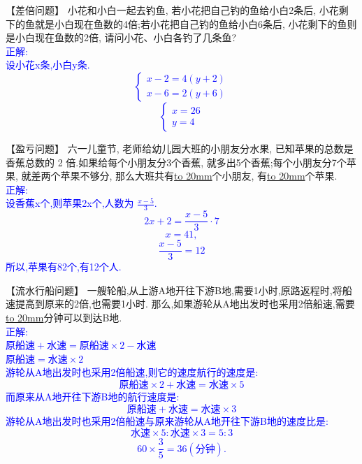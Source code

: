 \item {
    【差倍问题】
    小花和小白一起去钓鱼, 若小花把自己钓的鱼给小白2条后, 小花剩下的鱼就是小白现在鱼数的4倍;若小花把自己钓的鱼给小白6条后, 小花剩下的鱼则是小白现在鱼数的2倍, 请问小花、小白各钓了几条鱼?
    \ifshowSolution{}
        \fangsong{}\textcolor{blue}{
            \\正解:\\
            设小花x条,小白y条.\\
                \[\left\{\begin{array}{l}
                    x-2 = 4(y+2) \\
                    x-6 = 2(y+6)  
                \end{array}\right.\]
                \[\left\{\begin{array}{l}
                    x = 26 \\
                    y = 4 
                \end{array}\right.\]
        }
    \else
        \vspace{2cm}
    \fi
}

\item {
    【盈亏问题】
    六一儿童节, 老师给幼儿园大班的小朋友分水果, 已知苹果的总数是香蕉总数的 2 倍.如果给每个小朋友分3个香蕉, 就多出5个香蕉;每个小朋友分7个苹果, 就差两个苹果不够分, 那么大班共有\underline{\hbox to 20mm{}}个小朋友, 有\underline{\hbox to 20mm{}}个苹果.
    \ifshowSolution{}
        \fangsong{}\textcolor{blue}{
            \\正解:\\
            设香蕉x个,则苹果2x个,人数为 $\frac{x-5}{3}$.\\
            \[
                2x + 2 = \frac{x-5}{3}\cdot 7
            \]
            \[
                x = 41, 
            \]
            \[
                \frac{x-5}{3} = 12
            \]
            所以,苹果有82个,有12个人.
        }
    \else
        \vspace{2cm}
    \fi
}

\item {
    【流水行船问题】
    一艘轮船,从上游A地开往下游B地,需要1小时,原路返程时,将船速提高到原来的2倍,也需要1小时. 那么,如果游轮从A地出发时也采用2倍船速,需要\underline{\hbox to 20mm{}}分钟可以到达B地.
    \ifshowSolution{}
        \fangsong{}\textcolor{blue}{
            \\正解:\\
            $原船速+水速 = 原船速\times 2 - 水速$\\
            $原船速=水速\times 2$\\
            游轮从A地出发时也采用2倍船速,则它的速度航行的速度是:
            \[原船速\times 2 + 水速 = 水速\times 5\]
            而原来从A地开往下游B地的航行速度是:
            \[原船速+水速 = 水速\times 3\]
            游轮从A地出发时也采用2倍船速与原来游轮从A地开往下游B地的速度比是:
            \[水速\times 5 : 水速\times 3 = 5:3\]
            \[60\times \frac35 = 36(分钟). \]
        }
    \else
        \vspace{2cm}
    \fi
}

